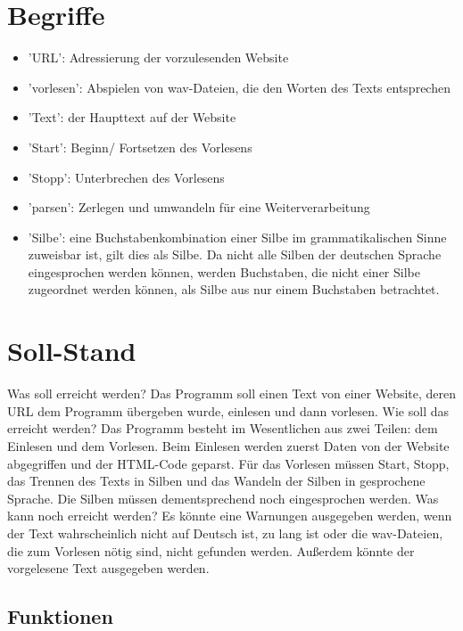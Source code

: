 \documentclass[12pt]{scrartcl}
\begin{document}
\section{Begriffe}
\begin{itemize}
    \item 'URL': Adressierung der vorzulesenden Website
    \item 'vorlesen': Abspielen von wav-Dateien, die den Worten des Texts entsprechen
    \item 'Text': der Haupttext auf der Website
    \item 'Start': Beginn/ Fortsetzen des Vorlesens
    \item 'Stopp': Unterbrechen des Vorlesens
    \item 'parsen': Zerlegen und umwandeln für eine Weiterverarbeitung
    \item 'Silbe': eine Buchstabenkombination einer Silbe im grammatikalischen Sinne zuweisbar ist, gilt dies als Silbe. Da nicht alle Silben der deutschen Sprache eingesprochen werden können, werden Buchstaben, die nicht                 einer Silbe zugeordnet werden können, als Silbe aus nur einem Buchstaben betrachtet.
\end{itemize}

\section{Soll-Stand}
Was soll erreicht werden?
Das Programm soll einen Text von einer Website, deren URL dem Programm übergeben wurde, einlesen und dann vorlesen.
Wie soll das erreicht werden?
Das Programm besteht im Wesentlichen aus zwei Teilen: dem Einlesen und dem Vorlesen. Beim Einlesen werden zuerst Daten von der Website abgegriffen und der HTML-Code geparst. Für das Vorlesen müssen Start, Stopp, das Trennen des Texts in Silben und das Wandeln der Silben in gesprochene Sprache. Die Silben müssen dementsprechend noch eingesprochen werden.
Was kann noch erreicht werden?
Es könnte eine Warnungen ausgegeben werden, wenn der Text wahrscheinlich nicht auf Deutsch ist, zu lang ist oder die wav-Dateien, die zum Vorlesen nötig sind, nicht gefunden werden. Außerdem könnte der vorgelesene Text ausgegeben werden.


\subsection{Funktionen}
\end{document}
